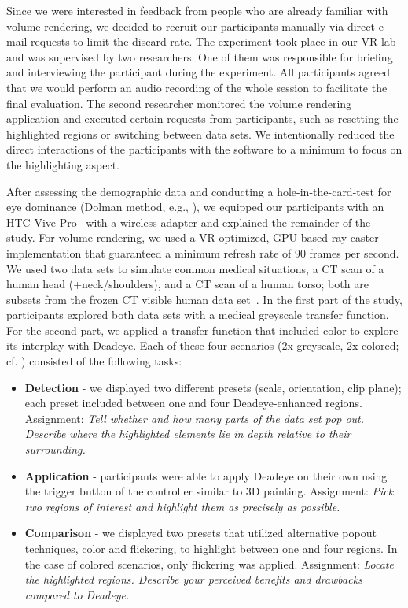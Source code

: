 \documentclass[journal]{vgtc}                %
\begin{document}
Since we were interested in feedback from people who are already familiar with volume rendering, we decided to recruit our participants manually via direct e-mail requests to limit the discard rate. The experiment took place in our VR lab and was supervised by two researchers. One of them was responsible for briefing and interviewing the participant during the experiment. All participants agreed that we would perform an audio recording of the whole session to facilitate the final evaluation. The second researcher monitored the volume rendering application and executed certain requests from participants, such as resetting the highlighted regions or switching between data sets. We intentionally reduced the direct interactions of the participants with the software to a minimum to focus on the highlighting aspect. 

After assessing the demographic data and conducting a hole-in-the-card-test for eye dominance (Dolman method, e.g., \cite{cheng2004association, porac1976dominant}), we equipped our participants with an HTC Vive Pro~\cite{vive} with a wireless adapter and explained the remainder of the study. For volume rendering, we used a VR-optimized, GPU-based ray caster implementation that guaranteed a minimum refresh rate of 90 frames per second. We used two data sets to simulate common medical situations, a CT scan of a human head (+neck/shoulders), and a CT scan of a human torso; both are subsets from the frozen CT visible human data set~\cite{662875}. In the first part of the study, participants explored both data sets with a medical greyscale transfer function. For the second part, we applied a transfer function that included color to explore its interplay with Deadeye. Each of these four scenarios (2x greyscale, 2x colored; cf. ) consisted of the following tasks:

 \begin{itemize}
  \setlength\itemsep{0.02 em}
  \item \textbf{Detection} - we displayed two different presets (scale, orientation, clip plane); each preset included between one and four Deadeye-enhanced regions. Assignment: \textit{Tell whether and how many parts of the data set pop out. Describe where the highlighted elements lie in depth relative to their surrounding.}
  \item \textbf{Application} - participants were able to apply Deadeye on their own using the trigger button of the controller similar to 3D painting. Assignment: \textit{Pick two regions of interest and highlight them as precisely as possible.}
  \item \textbf{Comparison} - we displayed two presets that utilized alternative popout techniques, color and flickering, to highlight between one and four regions. In the case of colored scenarios, only flickering was applied. Assignment: \textit{Locate the highlighted regions. Describe your perceived benefits and drawbacks compared to Deadeye.}
\end{itemize}
\end{document}

